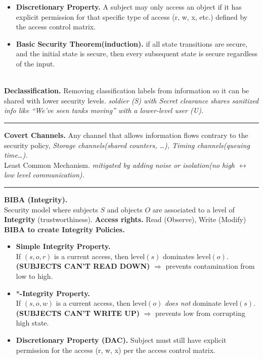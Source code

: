 \documentclass[9pt, a4paper]{extarticle}
\makeatletter
\let\oldwarning\warning
\renewcommand{\warning}{\raisebox{0.3ex}{\oldwarning}}
\renewcommand{\hline}{\noalign{\vskip 2px}\hrule\@height\arrayrulewidth\@width\linewidth\noalign{\vskip 2px}}
\makeatother
\begin{document}
\begin{minipage}[t]{0.495\textwidth}
\begin{minipage}[t]{0.5\textwidth}
\begin{itemize}[itemsep=2pt]
			\item[] \textbf{Discretionary Property.}
			      A subject may only access an object if it has explicit permission for that specific type of access (r, w, x, etc.) defined by the access control matrix.
			\item[] \textbf{Basic Security Theorem(induction).} if all state transitions are secure, and the initial state is secure, then every subsequent state is secure regardless of the input.
		\end{itemize}
	\end{minipage}\\
	\textbf{Declassification.} Removing classification labels from information so it can be shared with lower security levels. \textit{soldier (S) with \textit{Secret} clearance shares sanitized info like “We’ve seen tanks moving” with a lower-level user (U).}
	\hline
	\textbf{Covert Channels.} Any channel that allows information flows contrary to the security policy, \textit{Storage channels(shared counters, \dots), Timing channels(queuing time\dots).} \\\warning Least Common Mechanism.
	\textit{mitigated by adding noise or isolation(no high $\leftrightarrow$ low level communication).}
	\hline
	\begin{minipage}[t]{0.5\textwidth}
		\textbf{BIBA (Integrity).} \\Security model where subjects $S$ and objects $O$ are associated to a level of \textbf{Integrity} (trustworthiness). \textbf{Access rights.} Read (Observe), Write (Modify)\\
		\textbf{BIBA to create Integrity Policies.}
		\begin{itemize}[itemsep=2pt]
			\item[] \textbf{Simple Integrity Property.}\\
			      If $(s,o,r)$ is a current access, then $\text{level}(s)$ dominates $\text{level}(o)$.\\
			      \textbf{(SUBJECTS CAN'T READ DOWN)} $\Rightarrow$ prevents contamination from low to high.
			\item[]\textbf{$\ast$-Integrity Property.}\\ If $(s,o,w)$ is a current access, then $\text{level}(o)$ \emph{does not} dominate $\text{level}(s)$.\\
			      \textbf{(SUBJECTS CAN'T WRITE UP)} $\Rightarrow$ prevents low from corrupting high state.
			\item[] \textbf{Discretionary Property (DAC).} Subject must still have explicit permission for the access (r, w, x) per the access control matrix.

\end{itemize}
\end{minipage}
\end{minipage}
\end{document}
